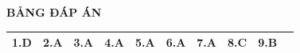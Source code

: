 \loigiai
{
	\begin{center}
		\textbf{BẢNG ĐÁP ÁN}
	\end{center}
	\begin{center}
		\begin{tabular}{|m{2.8em}|m{2.8em}|m{2.8em}|m{2.8em}|m{2.8em}|m{2.8em}|m{2.8em}|m{2.8em}|m{2.8em}|m{2.8em}|}
			\hline
			1.D  & 2.A  & 3.A  & 4.A  & 5.A  & 6.A  & 7.A & 8.C & 9.B & \\
			\hline
			
		\end{tabular}
	\end{center}
}

\whiteBGstarEnd